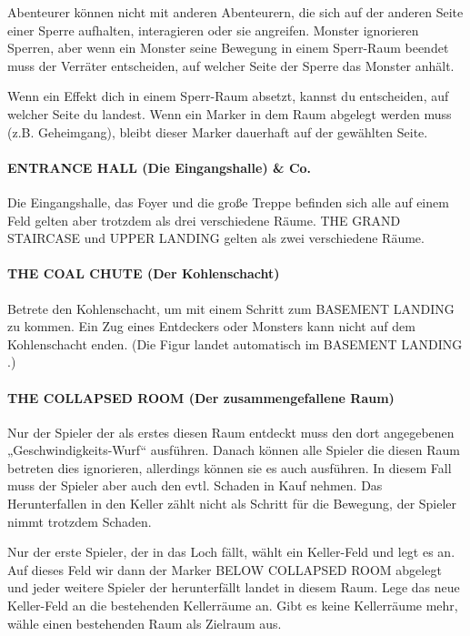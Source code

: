 Abenteurer können nicht mit anderen Abenteurern, die sich auf der anderen Seite einer Sperre aufhalten, interagieren oder sie angreifen. Monster ignorieren Sperren, aber wenn ein Monster seine Bewegung in einem Sperr-Raum beendet muss der Verräter entscheiden, auf welcher Seite der Sperre das Monster anhält.

Wenn ein Effekt dich in einem Sperr-Raum absetzt, kannst du entscheiden, auf welcher Seite du landest. Wenn ein Marker in dem Raum abgelegt werden muss (z.B. Geheimgang), bleibt dieser Marker dauerhaft auf der gewählten Seite.

\paragraph{ENTRANCE HALL (Die Eingangshalle) \& Co.}

Die Eingangshalle, das Foyer und die große Treppe befinden sich alle auf einem Feld gelten aber trotzdem als drei verschiedene Räume. THE GRAND STAIRCASE und UPPER LANDING gelten als zwei verschiedene Räume.


\paragraph{THE COAL CHUTE (Der Kohlenschacht)}

Betrete den Kohlenschacht, um mit einem Schritt zum BASEMENT LANDING zu kommen. Ein Zug eines Entdeckers oder Monsters kann nicht auf dem Kohlenschacht enden. (Die Figur landet automatisch im BASEMENT LANDING .)

\paragraph{THE COLLAPSED ROOM (Der zusammengefallene Raum)}

Nur der Spieler der als erstes diesen Raum entdeckt muss den dort angegebenen „Geschwindigkeits-Wurf“ ausführen. Danach können alle Spieler die diesen Raum betreten dies ignorieren, allerdings können sie es auch ausführen. In diesem Fall muss der Spieler aber auch den evtl. Schaden in Kauf nehmen. Das Herunterfallen in den Keller zählt nicht als Schritt für die Bewegung, der Spieler nimmt trotzdem Schaden.

Nur der erste Spieler, der in das Loch fällt, wählt ein Keller-Feld und legt es an. Auf dieses Feld wir dann der Marker BELOW COLLAPSED ROOM abgelegt und jeder weitere Spieler der herunterfällt landet in diesem Raum. Lege das neue Keller-Feld an die bestehenden Kellerräume an. Gibt es keine Kellerräume mehr, wähle einen bestehenden Raum als Zielraum aus.

